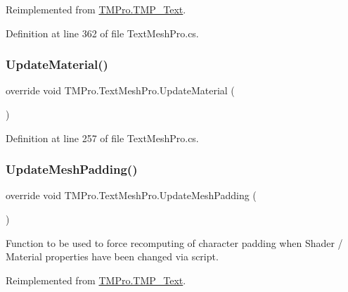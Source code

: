 Reimplemented from \mbox{\hyperlink{class_t_m_pro_1_1_t_m_p___text_a555f26eef9b5a5e51d27217c4c8adb8a}{T\+M\+Pro.\+T\+M\+P\+\_\+\+Text}}.



Definition at line 362 of file Text\+Mesh\+Pro.\+cs.

\mbox{\label{class_t_m_pro_1_1_text_mesh_pro_ae087fd09b3ce4bb5bfea21e7207f3d56}} 
\subsubsection{\texorpdfstring{UpdateMaterial()}{UpdateMaterial()}}
{\footnotesize\ttfamily override void T\+M\+Pro.\+Text\+Mesh\+Pro.\+Update\+Material (\begin{DoxyParamCaption}{ }\end{DoxyParamCaption})\hspace{0.3cm}{\ttfamily [protected]}}







Definition at line 257 of file Text\+Mesh\+Pro.\+cs.

\mbox{\label{class_t_m_pro_1_1_text_mesh_pro_a37394f39e8cdc5af63ecfa7286b5bdc3}} 
\subsubsection{\texorpdfstring{UpdateMeshPadding()}{UpdateMeshPadding()}}
{\footnotesize\ttfamily override void T\+M\+Pro.\+Text\+Mesh\+Pro.\+Update\+Mesh\+Padding (\begin{DoxyParamCaption}{ }\end{DoxyParamCaption})\hspace{0.3cm}{\ttfamily [virtual]}}



Function to be used to force recomputing of character padding when Shader / Material properties have been changed via script. 



Reimplemented from \mbox{\hyperlink{class_t_m_pro_1_1_t_m_p___text_a874daa5045c407a26694d92f855c0761}{T\+M\+Pro.\+T\+M\+P\+\_\+\+Text}}.



